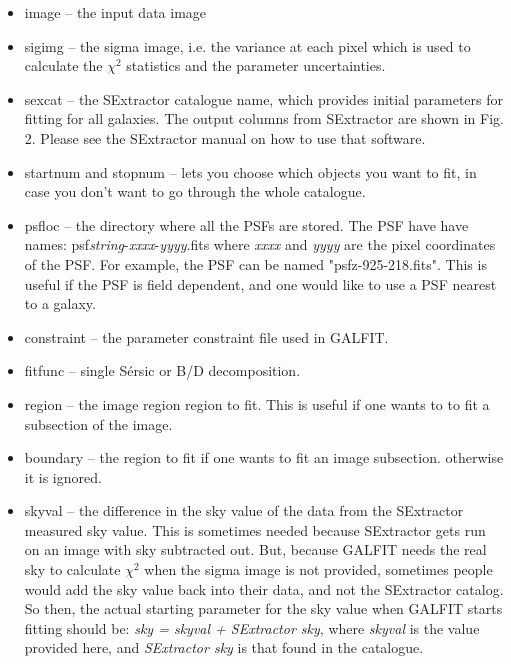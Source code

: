 \documentclass[preprint]{aastex}
\begin{document}
\begin {itemize}

\item image -- the input data image

\item sigimg -- the sigma image, i.e. the variance at each pixel which is used
to calculate the $\chi^2$ statistics and the parameter uncertainties.

\item sexcat -- the SExtractor catalogue name, which provides initial
parameters for fitting for all galaxies.  The output columns from SExtractor
are shown in Fig. 2.  Please see the SExtractor manual on how to use that
software.

\item startnum and stopnum -- lets you choose which objects you want to
fit, in case you don't want to go through the whole catalogue.

\item psfloc -- the directory where all the PSFs are stored.  The PSF have
have names: psf{\it string}-{\it xxxx}-{\it yyyy}.fits where {\it xxxx} and
{\it yyyy} are the pixel coordinates of the PSF.  For example, the PSF can be
named "psfz-925-218.fits".  This is useful if the PSF is field dependent, and
one would like to use a PSF nearest to a galaxy.

\item constraint -- the parameter constraint file used in GALFIT.

\item fitfunc -- single S\'ersic or B/D decomposition.

\item region -- the image region region to fit.  This is useful if one
wants to to fit a subsection of the image.

\item boundary -- the region to fit if one wants to fit an image subsection.
otherwise it is ignored.

\item skyval -- the difference in the sky value of the data from the
SExtractor measured sky value.  This is sometimes needed because SExtractor
gets run on an image with sky subtracted out.  But, because GALFIT needs the
real sky to calculate $\chi^2$ when the sigma image is not provided, sometimes
people would add the sky value back into their data, and not the SExtractor
catalog.  So then, the actual starting parameter for the sky value when GALFIT
starts fitting should be: {\it sky = skyval + SExtractor sky}, where {\it
skyval} is the value provided here, and {\it SExtractor sky} is that found in
the catalogue.


\end{itemize}
\end{document}

